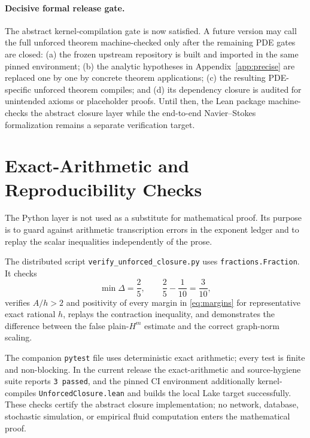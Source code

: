 \documentclass[11pt]{article}
\numberwithin{equation}{section}
\begin{document}
\paragraph{Decisive formal release gate.}
The abstract kernel-compilation gate is now satisfied.  A future version may call the full unforced theorem machine-checked only after the remaining PDE gates are closed: (a) the frozen upstream repository is built and imported in the same pinned environment; (b) the analytic hypotheses in Appendix~\ref{app:precise} are replaced one by one by concrete theorem applications; (c) the resulting PDE-specific unforced theorem compiles; and (d) its dependency closure is audited for unintended axioms or placeholder proofs.  Until then, the Lean package machine-checks the abstract closure layer while the end-to-end Navier--Stokes formalization remains a separate verification target.

\section{Exact-Arithmetic and Reproducibility Checks}\label{app:python}

The Python layer is not used as a substitute for mathematical proof.  Its purpose is to guard against arithmetic transcription errors in the exponent ledger and to replay the scalar inequalities independently of the prose.

The distributed script \texttt{verify\_unforced\_closure.py} uses \texttt{fractions.Fraction}.  It checks
\begin{equation}
\min\Delta=\frac25,
\qquad
\frac25-\frac1{10}=\frac3{10},
\label{eq:pytest1}
\end{equation}
verifies \(A/h>2\) and positivity of every margin in \eqref{eq:margins} for representative exact rational \(h\), replays the contraction inequality, and demonstrates the difference between the false plain-\(H^m\) estimate and the correct graph-norm scaling.

The companion \texttt{pytest} file uses deterministic exact arithmetic; every test is finite and non-blocking.  In the current release the exact-arithmetic and source-hygiene suite reports \texttt{3 passed}, and the pinned CI environment additionally kernel-compiles \texttt{UnforcedClosure.lean} and builds the local Lake target successfully.  These checks certify the abstract closure implementation; no network, database, stochastic simulation, or empirical fluid computation enters the mathematical proof.
\end{document}
